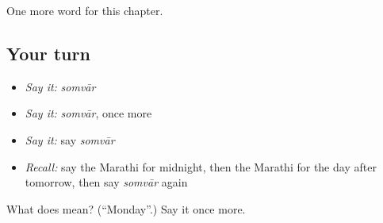 \begin{grammarlens}[title={What you've built}]
One more word for this chapter.
\end{grammarlens}

\subsection*{Your turn}
\begin{itemize}
\raggedright
  \item \emph{Say it:} \emph{somvār}
  \item \emph{Say it:} \emph{somvār}, once more
  \item \emph{Say it:} say \emph{somvār}
  \item \emph{Recall:} say the Marathi for midnight, then the Marathi for the day after tomorrow, then say \emph{somvār} again
\end{itemize}

\begin{tcolorbox}[breakable,colback=teal!4,colframe=teal!35!black,title={Before you move on}]
What does  mean? (\textquotedblleft{}Monday\textquotedblright{}.) Say it once more.
\end{tcolorbox}
